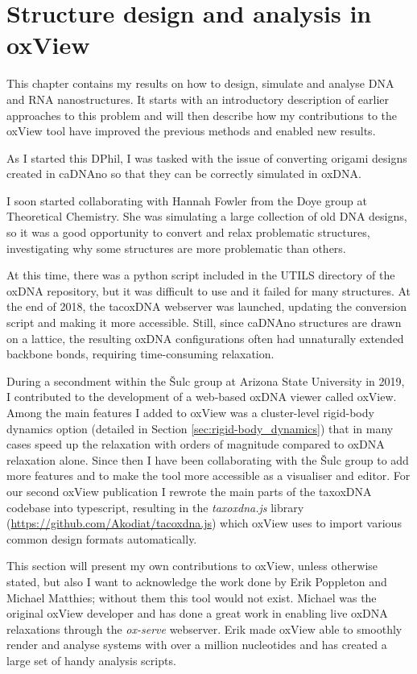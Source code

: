 \chapter{\label{ch:oxview}Structure design and analysis in oxView}
This chapter contains my results on how to design, simulate and analyse DNA and RNA nanostructures. It starts with an introductory description of earlier approaches to this problem and will then describe how my contributions to the oxView tool have improved the previous methods and enabled new results.

As I started this DPhil, I was tasked with the issue of converting origami designs created in caDNAno so that they can be correctly simulated in oxDNA.

I soon started collaborating with Hannah Fowler from the Doye group at Theoretical Chemistry. She was simulating a large collection of old DNA designs, so it was a good opportunity to convert and relax problematic structures, investigating why some structures are more problematic than others.

At this time, there was a python script included in the UTILS directory of the oxDNA repository, but it was difficult to use and it failed for many structures. At the end of 2018, the tacoxDNA webserver \cite{suma2019tacoxdna} was launched, updating the conversion script and making it more accessible. Still, since caDNAno structures are drawn on a lattice, the resulting oxDNA configurations often had unnaturally extended backbone bonds, requiring time-consuming relaxation.

During a secondment within the {\v{S}}ulc group at Arizona State University in 2019, I contributed to the development of a web-based oxDNA viewer called oxView\cite{poppleton2020design}. Among the main features I added to oxView was a cluster-level rigid-body dynamics option (detailed in Section \ref{sec:rigid-body_dynamics}) that in many cases speed up the relaxation with orders of magnitude compared to oxDNA relaxation alone. Since then I have been collaborating with the {\v{S}}ulc group to add more features and to make the tool more accessible as a visualiser and editor. For our second oxView publication I rewrote the main parts of the taxoxDNA codebase into typescript, resulting in the \emph{taxoxdna.js} library (\url{https://github.com/Akodiat/tacoxdna.js}) which oxView uses to import various common design formats automatically.

This section will present my own contributions to oxView, unless otherwise stated, but also I want to acknowledge the work done by Erik Poppleton and Michael Matthies; without them this tool would not exist. Michael was the original oxView developer and has done a great work in enabling live oxDNA relaxations through the \emph{ox-serve} webserver. Erik made oxView able to smoothly render and analyse systems with over a million nucleotides and has created a large set of handy analysis scripts.

